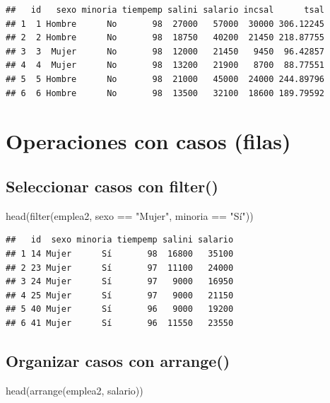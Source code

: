 \documentclass[
]{book}
\newenvironment{Shaded}{\begin{snugshade}}{\end{snugshade}}
\newcommand{\FunctionTok}[1]{\textcolor[rgb]{0.00,0.00,0.00}{#1}}
\newcommand{\NormalTok}[1]{#1}
\newcommand{\SpecialCharTok}[1]{\textcolor[rgb]{0.00,0.00,0.00}{#1}}
\newcommand{\StringTok}[1]{\textcolor[rgb]{0.31,0.60,0.02}{#1}}
\theoremstyle{break}
\theoremstyle{nonumberplain}
\begin{document}
\begin{verbatim}
##   id   sexo minoria tiempemp salini salario incsal      tsal
## 1  1 Hombre      No       98  27000   57000  30000 306.12245
## 2  2 Hombre      No       98  18750   40200  21450 218.87755
## 3  3  Mujer      No       98  12000   21450   9450  96.42857
## 4  4  Mujer      No       98  13200   21900   8700  88.77551
## 5  5 Hombre      No       98  21000   45000  24000 244.89796
## 6  6 Hombre      No       98  13500   32100  18600 189.79592
\end{verbatim}

\hypertarget{dplyr-casos}{%
\section{Operaciones con casos (filas)}\label{dplyr-casos}}

\hypertarget{seleccionar-casos-con-filter}{%
\subsection{\texorpdfstring{Seleccionar casos con \textbf{filter()}}{Seleccionar casos con filter()}}\label{seleccionar-casos-con-filter}}

\begin{Shaded}
\begin{Highlighting}[]
\FunctionTok{head}\NormalTok{(}\FunctionTok{filter}\NormalTok{(emplea2, sexo }\SpecialCharTok{==} \StringTok{"Mujer"}\NormalTok{, minoria }\SpecialCharTok{==} \StringTok{"Sí"}\NormalTok{))}
\end{Highlighting}
\end{Shaded}

\begin{verbatim}
##   id  sexo minoria tiempemp salini salario
## 1 14 Mujer      Sí       98  16800   35100
## 2 23 Mujer      Sí       97  11100   24000
## 3 24 Mujer      Sí       97   9000   16950
## 4 25 Mujer      Sí       97   9000   21150
## 5 40 Mujer      Sí       96   9000   19200
## 6 41 Mujer      Sí       96  11550   23550
\end{verbatim}

\hypertarget{organizar-casos-con-arrange}{%
\subsection{\texorpdfstring{Organizar casos con \textbf{arrange()}}{Organizar casos con arrange()}}\label{organizar-casos-con-arrange}}

\begin{Shaded}
\begin{Highlighting}[]
\FunctionTok{head}\NormalTok{(}\FunctionTok{arrange}\NormalTok{(emplea2, salario))}
\end{Highlighting}
\end{Shaded}
\end{document}
